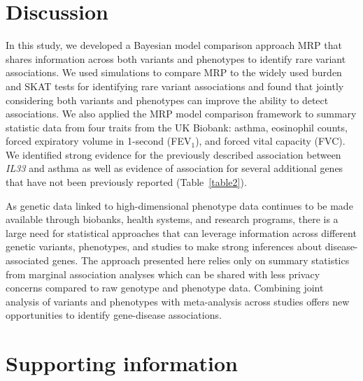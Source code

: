 \section*{Discussion}
In this study, we developed a Bayesian model comparison approach MRP that shares information across both variants and phenotypes to identify rare variant associations. We used simulations to compare MRP to the widely used burden and SKAT tests for identifying rare variant associations and found that jointly considering both variants and phenotypes can improve the ability to detect associations. We also applied the MRP model comparison framework to summary statistic data from four traits from the UK Biobank: asthma, eosinophil counts, forced expiratory volume in 1-second (FEV$_1$), and forced vital capacity (FVC). We identified strong evidence for the previously described association between \textit{IL33} and asthma\cite{DeBoever179762, 10.1371/journal.pgen.1006659} as well as evidence of association for several additional genes that have not been previously reported (Table~\ref{table2}). 

As genetic data linked to high-dimensional phenotype data continues to be made available through biobanks, health systems, and research programs, there is a large need for statistical approaches that can leverage information across different genetic variants, phenotypes, and studies to make strong inferences about disease-associated genes. The approach presented here relies only on summary statistics from marginal association analyses which can be shared with less privacy concerns compared to raw genotype and phenotype data. Combining joint analysis of variants and phenotypes with meta-analysis across studies offers new opportunities to identify gene-disease associations.



\section*{Supporting information}

